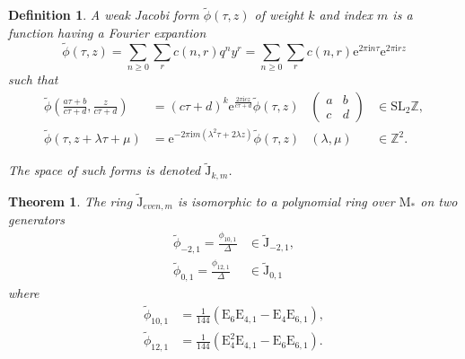 \documentclass[uplatex,dvipdfmx]{jsarticle}
\newtheorem{definition}{Definition}[section]
\newtheorem{theorem}{Theorem}[section]
\begin{document}
\begin{definition}
    A \textit{weak Jacobi form} 
    $\tilde{\phi} \left( \tau, z \right)$
    of weight
    $k$
    and index
    $m$
    is a function having a Fourier expantion
    \begin{equation}
        \tilde{\phi} \left( \tau, z \right)
        =
        \sum_{n \geq 0}
        \sum_{r}
        c\left( n, r \right)
        q^ny^r
        =
        \sum_{n \geq 0}
        \sum_{r}
        c\left( n, r \right)
        \mathrm{e}^{2 \pi \mathrm{i} n \tau}
        \mathrm{e}^{2 \pi \mathrm{i} r z}
    \end{equation}
    such that
    \begin{align}
        \tilde{\phi}
        \left( 
            \frac{a \tau + b}{c \tau + d},
            \frac{z}         {c \tau + d}
        \right)
        &=
        (c \tau + d)^k
        \mathrm{e}^{\frac{2 \pi \mathrm{i} cz}{c \tau + d}}
        \tilde{\phi}
        \left( \tau, z \right)
        &\begin{pmatrix}
            a &b \\
            c &d 
        \end{pmatrix}
        &\in \mathrm{SL}_2{\mathbb{Z}},\\
        \tilde{\phi}
        \left( 
            \tau,
            z + \lambda \tau + \mu
        \right)
        &=
        \mathrm{e}
        ^{-2 \pi \mathrm{i} m(\lambda^2 \tau + 2 \lambda z)}
        \tilde{\phi}
        \left( \tau, z \right)
        &\left( \lambda, \mu \right)
        &\in \mathbb{Z}^2.
    \end{align}

    The space of such forms is denoted
    $\tilde{\mathrm{J}}_{k, m}$.
\end{definition}

\begin{theorem}
    The ring
    $\tilde{\mathrm{J}}_{even, m}$ 
    is isomorphic to a polynomial ring over
    $\mathrm{M}_*$
    on two generators
    \begin{align}
        \tilde{\phi}_{-2, 1}
        =
        \frac{\phi_{10, 1}}{\Delta}
        &\in
        \tilde{\mathrm{J}}_{-2, 1},\\
        \tilde{\phi}_{0, 1}
        =
        \frac{\phi_{12, 1}}{\Delta}
        &\in
        \tilde{\mathrm{J}}_{0, 1}
    \end{align}
    where
    \begin{align}
        \tilde{\phi}_{10, 1}
        &=
        \frac{1}{144}
        (\mathrm{E}_6 \mathrm{E}_{4, 1}
        -
        \mathrm{E}_4 \mathrm{E}_{6, 1}),\\
        \tilde{\phi}_{12, 1}
        &=
        \frac{1}{144}
        (\mathrm{E}_4^2 \mathrm{E}_{4, 1}
        -
        \mathrm{E}_6 \mathrm{E}_{6, 1}).
    \end{align}
\end{theorem}
\end{document}
